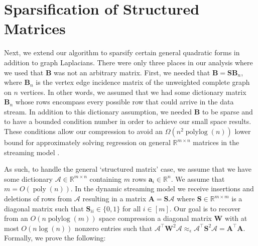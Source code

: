 \documentclass[11pt]{article}
\newcommand{\bs}[1]{\boldsymbol{#1}}
\newcommand{\bv}[1]{\mathbf{#1}}
\newcommand{\plog}{\mathop\mathrm{polylog}}
\newcommand{\poly}{\mathop\mathrm{poly}}
\newcommand{\R}{\mathbb{R}}
\newcommand{\mvar}[1]{\bv{#1}}
\newcommand{\ma}{\mvar{A}}
\newcommand{\mb}{\mvar{B}}
\newcommand{\ms}{\mvar{S}}
\newcommand{\mw}{\mvar{W}}
\begin{document}
\section{Sparsification of Structured Matrices}\label{structured}

Next, we extend our algorithm to sparsify certain general quadratic forms in addition to graph Laplacians. There were only three places in our analysis where we used that $\mb$ was not an arbitrary matrix. First, we needed that $\mb = \ms \mb_n$, where $\bv{B}_n$ is the vertex edge incidence matrix of the unweighted complete graph on $n$ vertices. In other words, we assumed that we had some dictionary matrix $\mb_n$ whose rows encompass every possible row that could arrive in the data stream. In addition to this dictionary assumption, we needed $\bv{B}$ to be sparse and to have a bounded condition number in order to achieve our small space results. These conditions allow our compression to avoid an $\Omega(n^2\plog(n))$ lower bound for approximately solving regression on general $\R^{m \times n}$ matrices in the streaming model \cite{clarkson2009numerical}.

As such, to handle the general `structured matrix' case, we assume that we have some dictionary $\bs{\mathcal{A}} \in \R^{m \times n}$ containing $m$ rows $\bv{a}_i \in \R^{n}$. We assume that $m = O(\poly(n))$. In the dynamic streaming model we receive insertions and deletions of rows from $\bs{\mathcal{A}}$ resulting in a matrix $\ma = \ms \bs{\mathcal{A}}$ where $\ms \in \R^{m \times m}$ is a diagonal matrix such that $\bv{S}_{ii} \in \{0, 1\}$ for all $i  \in [m]$. Our goal is to recover from an $O(n \plog (m))$ space compression a diagonal matrix $\mw$ with at most $O(n \log (n))$ nonzero entries such that $ \bs{\mathcal{A}}^\top \mw^2  \bs{\mathcal{A}} \approx_\epsilon  \bs{\mathcal{A}}^\top \ms^2  \bs{\mathcal{A}} = \bv{A}^\top \bv{A}$. Formally, we prove the following:
\end{document}
